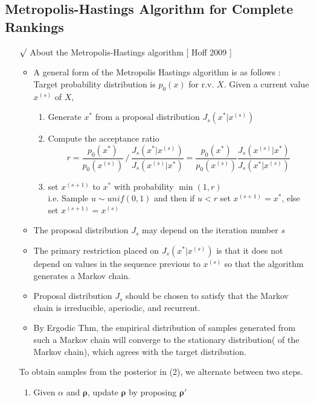 \documentclass[12pt]{article}
\newcommand{\rmk}{$\surd$}
\begin{document}
\subsection{Metropolis-Hastings Algorithm for Complete Rankings}
\begin{itemize}
    \item[\rmk] About the Metropolis-Hastings algorithm [ Hoff 2009 ]
    \begin{itemize}
        \item A general form of the Metropolis Hastings algorithm is as follows : \\ Target probability distribution is $p_0(x)$ for r.v. $X$. Given a current value $x^{(s)}$ of $X$, 
        \begin{enumerate}
            \item Generate $x^{*}$ from a proposal distribution $J_s(x^{*}|x^{(s)})$
            \item Compute the acceptance ratio $$ r=\frac{p_0(x^*)}{p_0(x^{(s)})}\, /\, \frac{J_s(x^*|x^{(s)})}{J_s(x^{(s)}|x^*)} = \frac{p_0(x^*)}{p_0(x^{(s)})}\frac{J_s(x^{(s)}|x^*)}{J_s(x^*|x^{(s)})} $$
            \item set $x^{(s+1)}$ to $x^*$ with probability $\min (1, r)$ \\ i.e. Sample $u\sim unif(0,1)$ and then if $u<r$ set $x^{(s+1)}=x^*$, else set $x^{(s+1)}=x^{(s)}$
        \end{enumerate}
        \item The proposal distribution $J_s$ may depend on the iteration number $s$
        \item The primary restriction placed on $J_s(x^*|x^{(s)})$ is that it does not depend on values in the sequence previous to $x^{(s)}$ so that the algorithm generates a Markov chain.
        \item Proposal distribution $J_s$ should be chosen to satisfy that the Markov chain is irreducible, aperiodic, and recurrent. 
        \item By Ergodic Thm, the empirical distribution of samples generated from such a Markov chain will converge to the stationary distribution( of the Markov chain), which agrees with the target distribution.
    \end{itemize}
    To obtain samples from the posterior in (2), we alternate between two steps.
    \begin{enumerate}
        \item Given $\alpha$ and $\boldsymbol{\rho}$, update $\boldsymbol{\rho}$ by proposing $\boldsymbol{\rho}'$

\end{enumerate}
\end{itemize}
\end{document}
